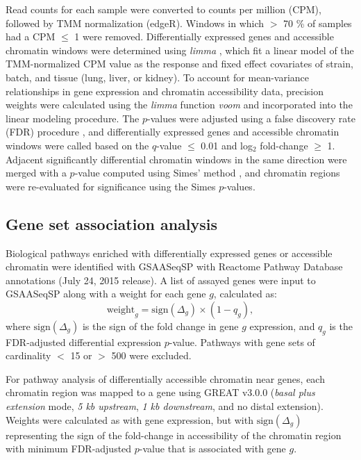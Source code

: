 \documentclass[10pt,letterpaper]{article}
\begin{document}
Read counts for each sample were converted to counts per million (CPM), followed by TMM normalization (edgeR). Windows in which $>$ 70 \% of samples had a CPM $\leq$ 1 were removed. Differentially expressed genes and accessible chromatin windows were determined using \textit{limma} \cite{limma}, which fit a linear model of the TMM-normalized CPM value as the response and fixed effect covariates of strain, batch, and tissue (lung, liver, or kidney). 
To account for mean-variance relationships in gene expression and chromatin accessibility data, precision weights were calculated using the \textit{limma} function \textit{voom} and incorporated into the linear modeling procedure. The $p$-values were adjusted using a false discovery rate (FDR) procedure \cite{Benjamini1995}, and differentially expressed genes and accessible chromatin windows were called based on the $q$-value $\le$ 0.01 and log$_{2}$ fold-change $\geq$ 1. Adjacent significantly differential chromatin windows in the same direction were merged with a $p$-value computed using Simes' method \cite{Sarkar1997}, and chromatin regions were re-evaluated for significance using the Simes $p$-values.

\subsection*{Gene set association analysis}

Biological pathways enriched with differentially expressed genes or accessible chromatin were identified with GSAASeqSP \cite{Xiong2014} with Reactome Pathway Database annotations (July 24, 2015 release). A list of assayed genes were input to GSAASeqSP along with a weight for each gene $g$, calculated as:
\begin{equation}
\text{weight}_{g} = \text{sign}(\Delta_{g}) \times (1-q_{g}),
\label{eq:gene_weighting}
\end{equation}
where $\text{sign}(\Delta_{g})$ is the sign of the fold change in gene $g$ expression, and $q_{g}$ is the FDR-adjusted differential expression $p$-value. Pathways with gene sets of cardinality $<$ 15 or $>$ 500 were excluded. 

For pathway analysis of differentially accessible chromatin near genes, each chromatin region was mapped to a gene using GREAT v3.0.0 (\textit{basal plus extension} mode, \textit{5 kb upstream}, \textit{1 kb downstream}, and no distal extension). 
Weights were calculated as with gene expression, but with $\text{sign}(\Delta_{g})$ representing the sign of the fold-change in accessibility of the chromatin region with minimum FDR-adjusted $p$-value that is associated with gene $g$.
\end{document}
